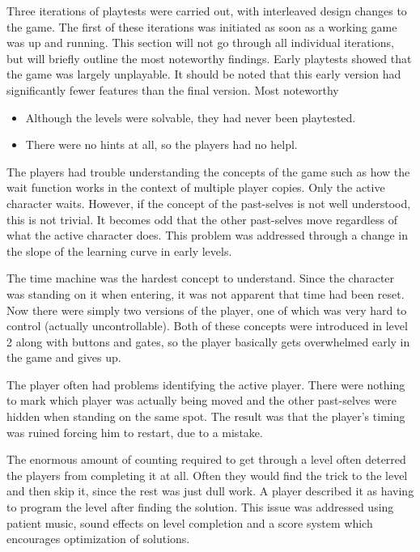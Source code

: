 Three iterations of playtests were carried out, with interleaved
design changes to the game. The first of these iterations was
initiated as soon as a working game was up and running. This section
will not go through all individual iterations, but will briefly
outline the most noteworthy findings.  Early playtests showed that
the game was largely unplayable. It should be noted that this early
version had significantly fewer features than the final version. Most
noteworthy

\begin{itemize}
\item Although the levels were solvable, they had never been playtested.
\item There were no hints at all, so the players had no helpl.
\end{itemize}

The players had trouble understanding the concepts of the game such as
how the wait function works in the context of multiple player
copies. Only the active character waits.  However, if the concept of the
past-selves is not well understood, this is not trivial. It becomes
odd that the other past-selves move regardless of what the active
character does. This problem was addressed through a change in the
slope of the learning curve in early levels.

The time machine was the hardest concept to understand. Since the
character was standing on it when entering, it was not apparent that
time had been reset. Now there were simply two versions of the player,
one of which was very hard to control (actually uncontrollable). Both
of these concepts were introduced in level 2 along with buttons and
gates, so the player basically gets overwhelmed early in the game and
gives up.

The player often had problems identifying the active player. There
were nothing to mark which player was actually being moved and the
other past-selves were hidden when standing on the same spot. The
result was that the player's timing was ruined forcing him to restart,
due to a mistake.

The enormous amount of counting required to get through a level often
deterred the players from completing it at all. Often they would find
the trick to the level and then skip it, since the rest was just dull
work. A player described it as having to program the level after
finding the solution. This issue was addressed using patient music,
sound effects on level completion and a score system which encourages
optimization of solutions.

